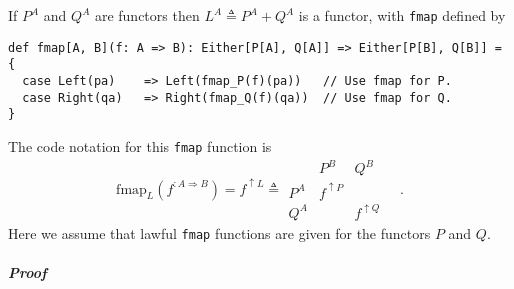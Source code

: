 If $P^{A}$ and $Q^{A}$ are functors then $L^{A}\triangleq P^{A}+Q^{A}$
is a functor, with \lstinline!fmap! defined by
\begin{lstlisting}
def fmap[A, B](f: A => B): Either[P[A], Q[A]] => Either[P[B], Q[B]] = {
  case Left(pa)    => Left(fmap_P(f)(pa))   // Use fmap for P.
  case Right(qa)   => Right(fmap_Q(f)(qa))  // Use fmap for Q.
}
\end{lstlisting}
The code notation for this \lstinline!fmap! function is
\[
\text{fmap}_{L}(f^{:A\Rightarrow B})=f^{\uparrow L}\triangleq\begin{array}{|c||cc|}
 & P^{B} & Q^{B}\\
\hline P^{A} & f^{\uparrow P} & \\
Q^{A} &  & f^{\uparrow Q}
\end{array}\quad.
\]
Here we assume that lawful \lstinline!fmap! functions are given for
the functors $P$ and $Q$.

\subparagraph{Proof}

